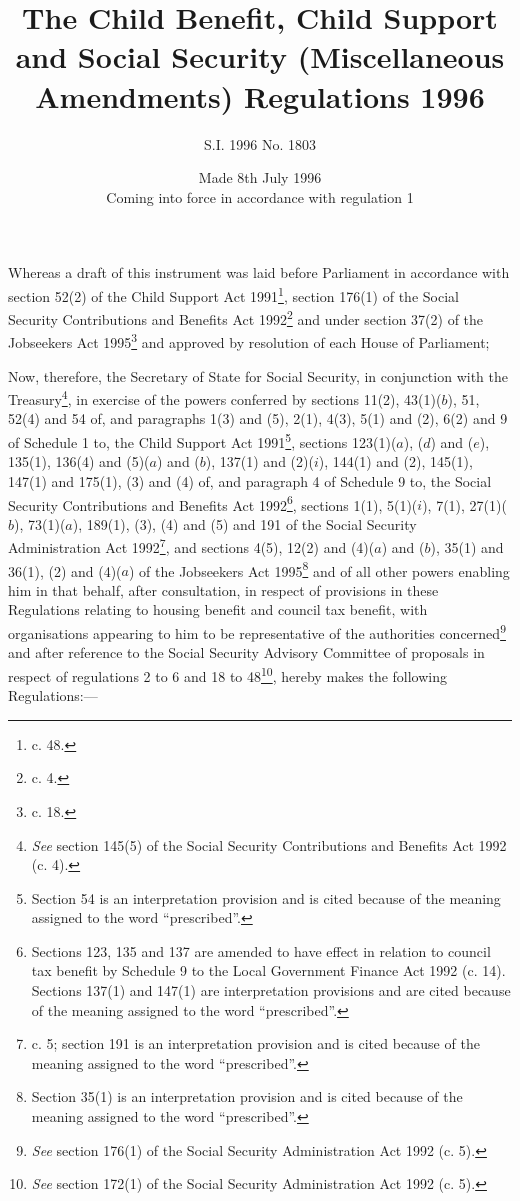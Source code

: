\documentclass[a4paper]{article}
\title{The Child Benefit, Child Support and Social Security (Miscellaneous Amendments) Regulations 1996}
\author{S.I. 1996 No. 1803}
\date{Made 8th July 1996\\Coming into force in accordance with regulation 1
}
\newcommand\fnote[1]{\footnote{\frenchspacing #1}}
\begin{document}
\maketitle

\noindent
Whereas a draft of this instrument was laid before Parliament in accordance with section 52(2) of the Child Support Act 1991\fnote{1991 c. 48.}, section 176(1) of the Social Security Contributions and Benefits Act 1992\fnote{1992 c. 4.} and under section 37(2) of the Jobseekers Act 1995\fnote{1995 c. 18.} and approved by resolution of each House of Parliament;

 Now, therefore, the Secretary of State for Social Security, in conjunction with the Treasury\fnote{\emph{See} section 145(5) of the Social Security Contributions and Benefits Act 1992 (c. 4).}, in exercise of the powers conferred by sections 11(2), 43(1)($b$), 51, 52(4) and 54 of, and paragraphs 1(3) and (5), 2(1), 4(3), 5(1) and (2), 6(2) and 9 of Schedule 1 to, the Child Support Act 1991\fnote{Section 54 is an interpretation provision and is cited because of the meaning assigned to the word “prescribed”.}, sections 123(1)($a$), ($d$) and ($e$), 135(1), 136(4) and (5)($a$) and ($b$), 137(1) and (2)($i$), 144(1) and (2), 145(1), 147(1) and 175(1), (3) and (4) of, and paragraph 4 of Schedule 9 to, the Social Security Contributions and Benefits Act 1992\footnote{\frenchspacing Sections 123, 135 and 137 are amended to have effect in relation to council tax benefit by Schedule 9 to the Local Government Finance Act 1992 (c. 14). Sections 137(1) and 147(1) are interpretation provisions and are cited because of the meaning assigned to the word “prescribed”.}, sections 1(1), 5(1)($i$), 7(1), 27(1)($b$), 73(1)($a$), 189(1), (3), (4) and (5) and 191 of the Social Security Administration Act 1992\fnote{1992 c. 5; section 191 is an interpretation provision and is cited because of the meaning assigned to the word “prescribed”.}, and sections 4(5), 12(2) and (4)($a$) and ($b$), 35(1) and 36(1), (2) and (4)($a$) of the Jobseekers Act 1995\fnote{Section 35(1) is an interpretation provision and is cited because of the meaning assigned to the word “prescribed”.} and of all other powers enabling him in that behalf, after consultation, in respect of provisions in these Regulations relating to housing benefit and council tax benefit, with organisations appearing to him to be representative of the authorities concerned\fnote{\emph{See} section 176(1) of the Social Security Administration Act 1992 (c. 5).} and after reference to the Social Security Advisory Committee of proposals in respect of regulations 2 to 6 and 18 to 48\fnote{\emph{See} section 172(1) of the Social Security Administration Act 1992 (c. 5).}, hereby makes the following Regulations:—
\end{document}
